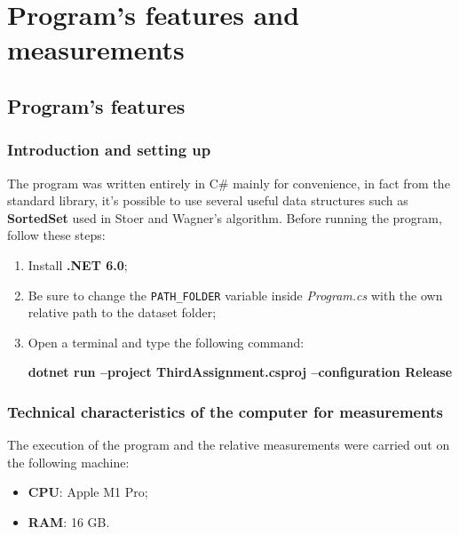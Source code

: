 \section{Program's features and measurements}

\subsection{Program's features}

\subsubsection{Introduction and setting up}
The program was written entirely in C\# mainly for convenience, in fact from the standard library, it's possible to use several useful data structures such as \textbf{SortedSet} used in Stoer and Wagner's algorithm.
Before running the program, follow these steps:
\begin{enumerate}
    \item Install \textbf{.NET 6.0};
    \item Be sure to change the \verb|PATH_FOLDER| variable inside \textit{Program.cs} with the own relative path to the dataset folder;
    \item Open a terminal and type the following command:\\
        \centerline{\textbf{dotnet run --project ThirdAssignment.csproj --configuration Release}}
\end{enumerate}

\subsubsection{Technical characteristics of the computer for measurements}
The execution of the program and the relative measurements were carried out on the following machine:
\begin{itemize}
    \item \textbf{CPU}: Apple M1 Pro;
    \item \textbf{RAM}: 16 GB.
\end{itemize}

